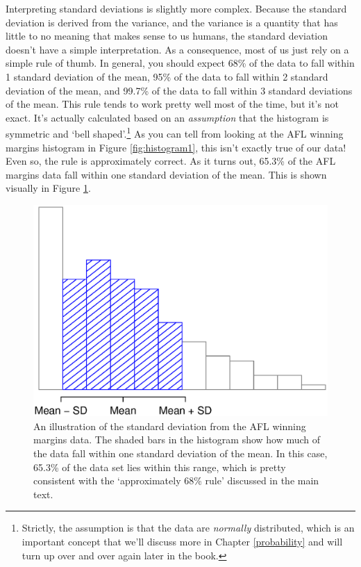 \documentclass[
]{book}
\begin{document}
Interpreting standard deviations is slightly more complex. Because the standard deviation is derived from the variance, and the variance is a quantity that has little to no meaning that makes sense to us humans, the standard deviation doesn't have a simple interpretation. As a consequence, most of us just rely on a simple rule of thumb. In general, you should expect 68\% of the data to fall within 1 standard deviation of the mean, 95\% of the data to fall within 2 standard deviation of the mean, and 99.7\% of the data to fall within 3 standard deviations of the mean. This rule tends to work pretty well most of the time, but it's not exact. It's actually calculated based on an \emph{assumption} that the histogram is symmetric and `bell shaped'.\footnote{Strictly, the assumption is that the data are \emph{normally} distributed, which is an important concept that we'll discuss more in Chapter \ref{probability} and will turn up over and over again later in the book.} As you can tell from looking at the AFL winning margins histogram in Figure \ref{fig:histogram1}, this isn't exactly true of our data! Even so, the rule is approximately correct. As it turns out, 65.3\% of the AFL margins data fall within one standard deviation of the mean. This is shown visually in Figure \ref{fig:aflsd}.

\begin{figure}
\centering
\includegraphics{img/descriptives/aflSD.eps}
\caption{\label{fig:aflsd}An illustration of the standard deviation from the AFL winning margins data. The shaded bars in the histogram show how much of the data fall within one standard deviation of the mean. In this case, 65.3\% of the data set lies within this range, which is pretty consistent with the `approximately 68\% rule' discussed in the main text.}
\end{figure}
\end{document}
